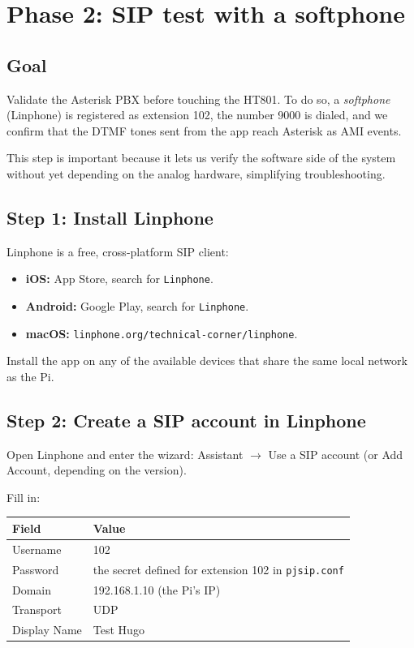 \chapter{Phase 2: SIP test with a softphone}

\section{Goal}

Validate the Asterisk PBX before touching the HT801. To do so, a \emph{softphone} (Linphone) is registered as extension 102, the number 9000 is dialed, and we confirm that the DTMF tones sent from the app reach Asterisk as AMI events.

This step is important because it lets us verify the software side of the system without yet depending on the analog hardware, simplifying troubleshooting.

\section{Step 1: Install Linphone}

Linphone is a free, cross-platform SIP client:

\begin{itemize}
  \item \textbf{iOS:} App Store, search for \texttt{Linphone}.
  \item \textbf{Android:} Google Play, search for \texttt{Linphone}.
  \item \textbf{macOS:} \texttt{linphone.org/technical-corner/linphone}.
\end{itemize}

Install the app on any of the available devices that share the same local network as the Pi.

\section{Step 2: Create a SIP account in Linphone}

Open Linphone and enter the wizard: \textsf{Assistant} $\to$ \textsf{Use a SIP account} (or \textsf{Add Account}, depending on the version).

Fill in:

\begin{table}[h]
\centering
\begin{tabular}{ll}
\toprule
\textbf{Field} & \textbf{Value} \\
\midrule
Username & 102 \\
Password & the secret defined for extension 102 in \texttt{pjsip.conf} \\
Domain & 192.168.1.10 (the Pi's IP) \\
Transport & UDP \\
Display Name & Test Hugo \\
\bottomrule
\end{tabular}
\end{table}

